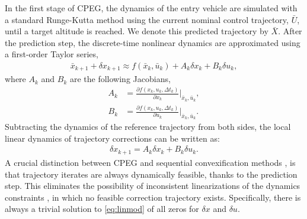 In the first stage of CPEG, the dynamics of the entry vehicle are simulated with a standard Runge-Kutta method using the current nominal control trajectory, $\bar{U}$, until a target altitude is reached. We denote this predicted trajectory by $\bar{X}$. After the prediction step, the discrete-time nonlinear dynamics are approximated using a first-order Taylor series,
\begin{align}
    \bar{x}_{k+1} + \delta x_{k+1} \approx f(\bar{x}_k,\bar{u}_k) + A_k \delta x_k + B_k \delta u_k,
\end{align}
where $A_k$ and $B_k$ are the following Jacobians,
\begin{align}
    A_k &= \frac{\partial f(x_k,u_k,\Delta t_k)}{\partial x_k} \bigg\rvert _{\bar{x}_k,\bar{u}_k}, \label{jacob1}\\
    B_k &= \frac{\partial f(x_k,u_k,\Delta t_k)}{\partial u_k}\bigg\rvert _{\bar{x}_k,\bar{u}_k}. \label{jacob2}
\end{align}
Subtracting the dynamics of the reference trajectory from both sides, the local linear dynamics of trajectory corrections can be written as:
\begin{align}
    \delta x_{k+1} = A_k \delta x_k + B_k \delta u_k.\label{eq:linmod}
\end{align}
A crucial distinction between CPEG and sequential convexification methods \cite{wang2016,malyuta2021,mao2019}, is that trajectory iterates are always dynamically feasible, thanks to the prediction step. This eliminates the possibility of inconsistent linearizations of the dynamics constraints \cite{nocedal2006}, in which no feasible correction trajectory exists. Specifically, there is always a trivial solution to \eqref{eq:linmod} of all zeros for $\delta x$ and $\delta u$.

